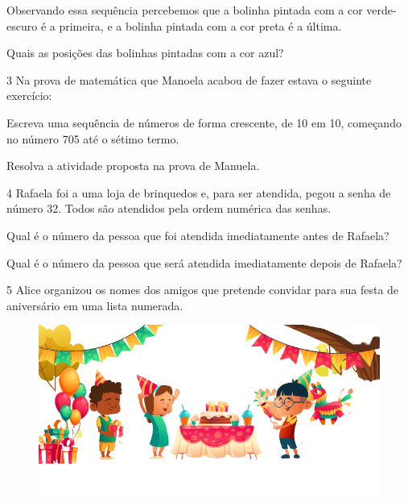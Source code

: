 Observando essa sequência percebemos que a bolinha pintada com a cor
verde-escuro é a primeira, e a bolinha pintada com a cor preta é a
última.

Quais as posições das bolinhas pintadas com a cor azul?


\num{3} Na prova de matemática que Manoela acabou de fazer estava o seguinte exercício:

\begin{myquote}
Escreva uma sequência de números de forma crescente, de 10 em 10, começando no número 705 até o sétimo termo.


\end{myquote}

Resolva a atividade proposta na prova de Manuela.


\num{4} Rafaela foi a uma loja de brinquedos e, para ser atendida, pegou a senha de
número 32. Todos são atendidos pela ordem numérica das senhas.



\begin{escolha}
\item Qual é o número da pessoa que foi atendida imediatamente antes de Rafaela?

\item Qual é o número da pessoa que será atendida imediatamente depois de Rafaela?
\end{escolha}

\pagebreak

\num{5} Alice organizou os nomes dos amigos que pretende convidar para sua
festa de aniversário em uma lista numerada.

\begin{figure}[htpb!]
\includegraphics[width=\textwidth]{./media/image28a.png}
\end{figure}

